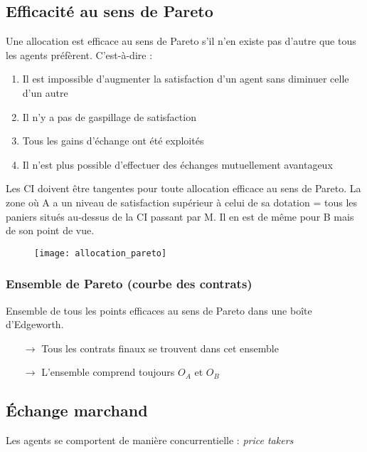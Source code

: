 \subsection{Efficacité au sens de Pareto}

Une allocation est efficace au sens de Pareto s'il n'en existe pas d'autre que tous les agents préfèrent.
C'est-à-dire :
\begin{enumerate}
\item Il est impossible d'augmenter la satisfaction d'un agent sans diminuer celle d'un autre
\item Il n'y a pas de gaspillage de satisfaction
\item Tous les gains d'échange ont été exploités
\item Il n'est plus possible d'effectuer des échanges mutuellement avantageux
\end{enumerate}

Les CI doivent être tangentes pour toute allocation efficace au sens de Pareto.
\newpage
La zone où A a un niveau de satisfaction supérieur à celui de sa dotation = tous les paniers situés au-dessus de la CI passant par M. Il en est de même pour B mais de son point de vue.
\begin{figure}[H]
	\centering
	\texttt{[image: allocation\_pareto]}
\end{figure}

\subsubsection{Ensemble de Pareto (courbe des contrats)}

Ensemble de tous les points efficaces au sens de Pareto dans une boîte d'Edgeworth.
\begin{itemize}
\item[$\rightarrow$] Tous les contrats finaux se trouvent dans cet ensemble
\item[$\rightarrow$] L'ensemble comprend toujours $O_A$ et $O_B$
\end{itemize}

\subsection{Échange marchand}

Les agents se comportent de manière concurrentielle : \textit{price takers}

